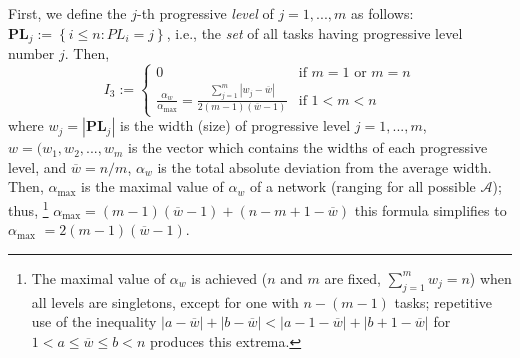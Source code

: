 \documentclass[preprint,
3p]{elsarticle} %
\begin{document}
\begin{appendices}
First, we define the \(j\)-th progressive \emph{level} of \(j=1,...,m\)
as follows: \(\mathbf{PL}_{j}:=\left\{i\leq n:PL_{i}=j\right\}\), i.e.,
the \emph{set} of all tasks having progressive level number \(j\). Then,
\begin{equation}
\label{eq:I3}
    I_3:=\begin{cases} 0 & \text{if $m=1$ or $m =n$} \\ \frac{\alpha_w}{\alpha_{\max}}= \frac{
\sum\limits_{j=1}^m |w_{j} - \overline{w}| }{2(m-1)(\overline{w}-1)} & \text{if $1<m<n$}\end{cases}
\end{equation} \noindent  where \(w_{j}=|\mathbf{PL}_{j}|\) is the width
(size) of progressive level \(j=1,...,m\), \(w=(w_1,w_2,...,w_m\) is the
vector which contains the widths of each progressive level, and
\(\overline{w}=n/m\), \(\alpha_{w}\) is the total absolute deviation
from the average width. Then, \(\alpha_{\max}\) is the maximal value of
\(\alpha_{w}\) of a network (ranging for all possible \(\mathcal{A}\));
thus,
\footnote{The maximal value of $\alpha _{w}$ is achieved ($n$ and $m$ are fixed, $\sum_{j=1}^{m}w_{j}=n$) when all levels are singletons, except for one with $n-\left( m-1\right)$ tasks; repetitive use of the inequality $\left\vert a-\overline{w}\right\vert +\left\vert b-\overline{w}\right\vert <\left\vert a-1-\overline{w}\right\vert +\left\vert b+1-\overline{w}\right\vert$ for $1<a\leq \overline{w}\leq b<n$ produces this extrema. 
} \quad \(\alpha_{\max}=(m-1)(\overline{w}-1)+(n-m+1-\overline{w})\)
\quad this formula simplifies to \(\alpha_{\max}\)
\(=2(m-1)(\overline{w}-1)\). \medskip


\end{appendices}
\end{document}
